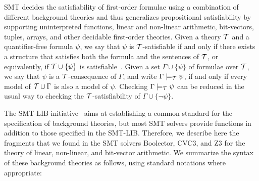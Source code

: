 \documentclass[a4paper]{llncs}
\begin{document}
SMT decides the satisfiability of first-order formulae using a
combination of different background theories and thus generalizes propositional
satisfiability by supporting uninterpreted functions, linear and non-linear
arithmetic, bit-vectors, tuples, arrays, and other decidable first-order
theories. Given a theory ${\cal T}$ and a quantifier-free formula $\psi$, we
say that $\psi$ is $\cal T$-satisfiable if and only if there exists a structure
that satisfies both the formula and the sentences of ${\cal T}$, or
equivalently, if ${\cal T}\cup \{\psi\}$ is satisfiable~\cite{Bradley07}. Given
a set $\Gamma\cup \{\psi\}$ of formulae over $\cal T$, we say that $\psi$ is a
$\cal T$-consequence of $\Gamma$, and write $\Gamma\models_{\cal T}\psi$, if
and only if every model of ${\cal T}\cup\Gamma$ is also a model of $\psi$.
Checking $\Gamma\models_{\cal T}\psi$ can be reduced in the usual way to
checking the $\cal T$-satisfiability of $\Gamma\cup\{\neg\psi\}$.

The SMT-LIB initiative~\cite{smtlib09} aims at establishing a common standard
for the specification of background theories, but most SMT solvers provide functions
in addition to those specified in the SMT-LIB. Therefore, we describe here the fragments
that we found in the SMT solvers Boolector, CVC3, and Z3 for the theory of linear, non-linear,
and bit-vector arithmetic. We summarize the syntax of these background theories as follows,
using standard notations where appropriate:
\end{document}
